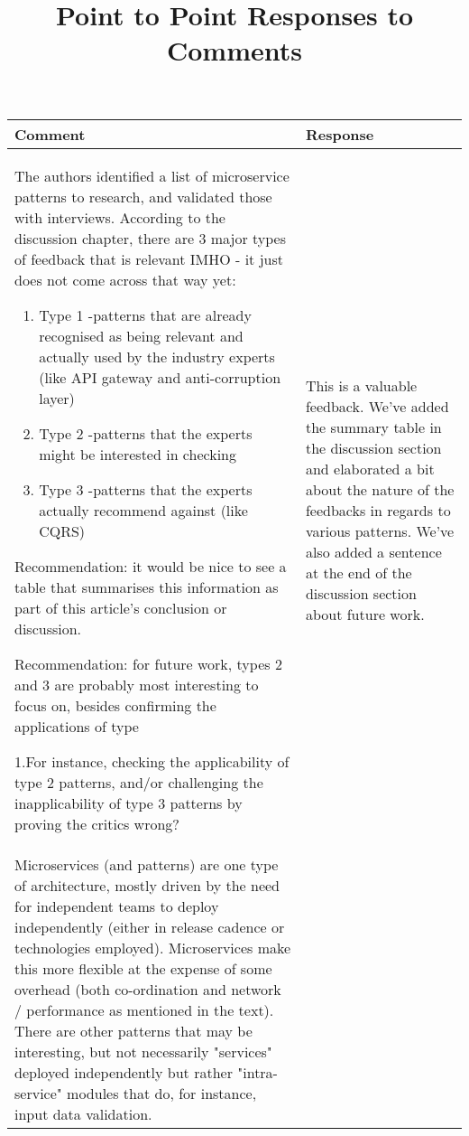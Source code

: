 \documentclass{article}
\begin{document}
\title{Point to Point Responses to Comments}

\maketitle



\begin{longtable}{|p{7cm}|p{7cm}|}
   
    \hline
    \rule[-1.5ex]{0pt}{4.5ex} Comment & Response \\ \hline
    \rule[-1.5ex]{0pt}{4.5ex} The authors identified a list of microservice patterns to research, and validated those with interviews. According to the discussion chapter, there are 3  major types of feedback that is relevant IMHO - it just does not come across that way yet:

    \begin{enumerate}
        \item Type 1 -patterns that are already recognised as being relevant and actually used by the industry experts (like API gateway and anti-corruption layer)
        \item  Type 2 -patterns that the experts might be interested in checking
        \item Type 3 -patterns that the experts actually recommend against (like CQRS)
    \end{enumerate}
   

    

    Recommendation: it would be nice to see a table that summarises this information as part of this article's conclusion or discussion.

    Recommendation: for future work, types 2 and 3 are probably most interesting to focus on, besides confirming the applications of type 
    
    1.For instance, checking the applicability of type 2 patterns, and/or challenging the inapplicability of type 3 patterns by proving the 
    critics wrong? & This is a valuable feedback. We've added the summary table in the discussion section and elaborated a bit about the nature of the feedbacks in regards to various patterns. We've also added a sentence at the end of the discussion section about future work.\\ \hline

    \rule[-1.5ex]{0pt}{4.5ex} 
    
    Microservices (and patterns) are one type of architecture, mostly driven by the need for independent teams to deploy independently (either in release cadence or technologies employed). Microservices make this more flexible at the expense of some overhead (both co-ordination and network / performance as mentioned in the text). There are other patterns that may be interesting, but not necessarily "services" deployed independently but rather "intra-service" modules that do, for instance, input data validation. 
    

\end{longtable}
\end{document}
